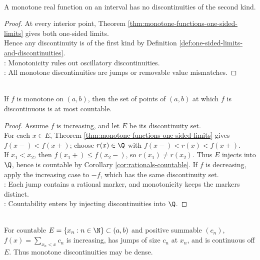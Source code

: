 \begin{corollary} \label{cor:monotone-no-second-kind-discontinuities} \\
A monotone real function on an interval has no discontinuities of the second kind.
\begin{proof}
At every interior point, Theorem \ref{thm:monotone-functions-one-sided-limits} gives both one-sided limits.\\
Hence any discontinuity is of the first kind by Definition \ref{def:one-sided-limits-and-discontinuities}.\\
: Monotonicity rules out oscillatory discontinuities.\\
: All monotone discontinuities are jumps or removable value mismatches.
\end{proof}
\end{corollary}

\begin{theorem} \label{thm:monotone-discontinuities-countable} \\
If $f$ is monotone on $(a,b)$, then the set of points of $(a,b)$ at which $f$ is discontinuous is at most countable.
\begin{proof}
Assume $f$ is increasing, and let $E$ be its discontinuity set.\\
For each $x\in E$, Theorem \ref{thm:monotone-functions-one-sided-limits} gives $f(x-)<f(x+)$; choose $r(x)\in\Q$ with $f(x-)<r(x)<f(x+)$.\\
If $x_1<x_2$, then $f(x_1+)\leq f(x_2-)$, so $r(x_1)\neq r(x_2)$. Thus $E$ injects into $\Q$, hence is countable by Corollary \ref{cor:rationals-countable}. If $f$ is decreasing, apply the increasing case to $-f$, which has the same discontinuity set.\\
: Each jump contains a rational marker, and monotonicity keeps the markers distinct.\\
: Countability enters by injecting discontinuities into $\Q$.
\end{proof}
\end{theorem}

\begin{remark} \label{rem:monotone-discontinuities-need-not-be-isolated} \\
For countable $E=\{x_n:n\in\N\}\subset(a,b)$ and positive summable $(c_n)$, $f(x)=\sum\limits_{x_n<x}c_n$ is increasing, has jumps of size $c_n$ at $x_n$, and is continuous off $E$. Thus monotone discontinuities may be dense.
\end{remark}

